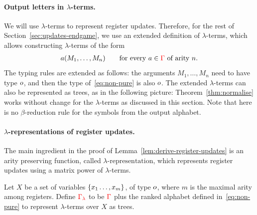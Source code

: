 \paragraph*{Output letters in $\lambda$-terms.} We will   use $\lambda$-terms to represent register updates. Therefore, for the  rest of Section~\ref{sec:updates-endgame}, we use an extended definition of $\lambda$-terms, which allows  constructing $\lambda$-terms of the form 
\begin{align}\label{eq:non-pure}
a(M_1,\ldots,M_n) \qquad \text{for every $a \in {\color{red}{\Gamma}}$ of arity $n$.}
\end{align}
The typing rules are extended as follows: the arguments $M_1,\ldots,M_n$ need to have type $o$, and then the  type of~\eqref{eq:non-pure} is also $o$. The extended $\lambda$-terms can also  be represented as trees, as in the following picture:
Theorem~\ref{thm:normalise} works without change for the  $\lambda$-terms as discussed in this section. Note that here is no $\beta$-reduction rule for the symbols from the output alphabet. 


\paragraph*{$\lambda$-representations of register updates.}
The main ingredient in the proof of Lemma~\ref{lem:derive-register-updates} is an arity preserving function, called \emph{$\lambda\text{-representation}$}, which represents register updates using a matrix power of $\lambda$-terms. 

Let $X$ be a set of variables $\{x_1\dots,x_m\}$, of type $o$,  where $m$ is the maximal arity among registers. Define  ${\color{red}{\Gamma_\lambda}}$ to be ${\color{red}{\Gamma}}$ plus the ranked alphabet defined in~\eqref{eq:non-pure} to represent $\lambda$-terms over $X$ as trees. 


